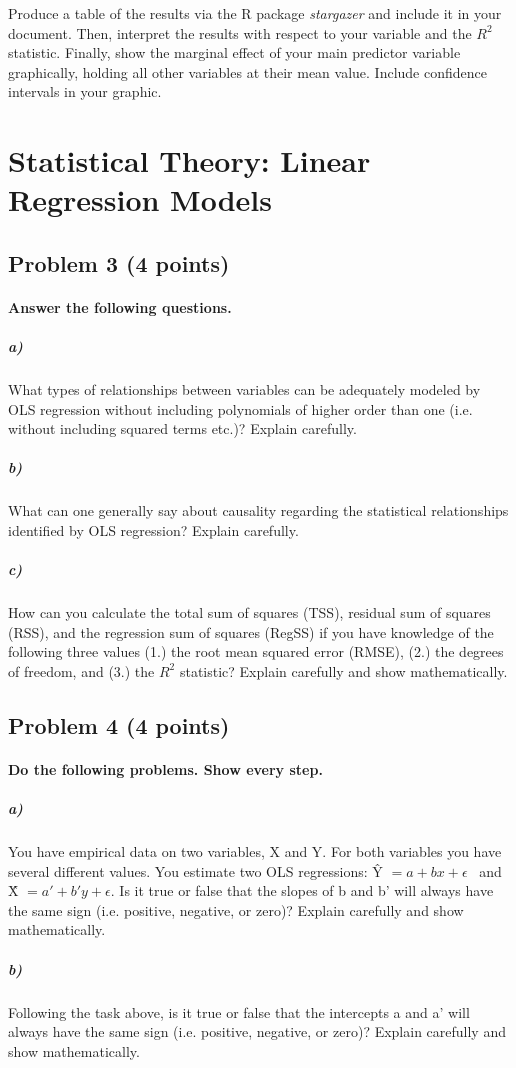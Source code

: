 \documentclass[12pt]{article}
\begin{document}
Produce a table of the results via the R package \textit{stargazer} and include it in your document. Then, interpret the results with respect to your variable and the $R^2$ statistic. Finally, show the marginal effect of your main predictor variable graphically, holding all other variables at their mean value. Include confidence intervals in your graphic.



\pagebreak

\section*{Statistical Theory: Linear Regression Models}

\subsection*{Problem 3 (4 points)}

\paragraph{Answer the following questions.}

\subparagraph{a)} What types of relationships between variables can be adequately modeled by OLS regression without including polynomials of higher order than one (i.e. without including squared terms etc.)? Explain carefully.

\subparagraph{b)} What can one generally say about causality regarding the statistical relationships identified by OLS regression? Explain carefully.

\subparagraph{c)} How can you calculate the total sum of squares (TSS), residual sum of squares (RSS), and the regression sum of squares (RegSS) if you have knowledge of the following three values (1.) the root mean squared error (RMSE), (2.) the degrees of freedom, and (3.) the $R^2$ statistic? Explain carefully and show mathematically.



\subsection*{Problem 4 (4 points)}

\paragraph{Do the following problems. Show every step.}

\subparagraph{a)} You have empirical data on two variables, X and Y. For both variables you have several different values. You estimate two OLS regressions: \^{Y} $= a + bx + \epsilon$ \ and \^{X} $= a' + b'y + \epsilon$. Is it true or false that the slopes of b and b' will always have the same sign (i.e. positive, negative, or zero)? Explain carefully and show mathematically.

\subparagraph{b)} Following the task above, is it true or false that the intercepts a and a' will always have the same sign (i.e. positive, negative, or zero)? Explain carefully and show mathematically.
\end{document}
